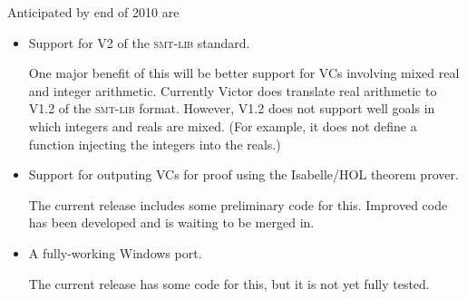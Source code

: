 \documentclass[12pt,fleqn]{article}
\newcommand{\zthree}{\textsc{Z}3}
\newcommand{\smt}{\textsc{Smt}}
\newcommand{\smtlib}{\textsc{smt-lib}}
\begin{document}
Anticipated by end of 2010 are
\begin{itemize}
\item Support for V2 of the \smtlib{} standard. 

  One major benefit of this will be better support for VCs involving
  mixed real and integer arithmetic.  Currently Victor does translate
  real arithmetic to V1.2 of the \smtlib{} format. However, V1.2 does not
  support well goals in which integers and reals are mixed. (For example, 
  it does not define a function injecting the integers into the reals.)

\item Support for outputing VCs for proof using the Isabelle/HOL
  theorem prover.

  The current release includes some preliminary code for this.
  Improved code has been developed and is waiting to be merged in.

\item A fully-working Windows port.

  The current release has some code for this, but it is not yet fully tested.
\end{itemize}


\end{document}
